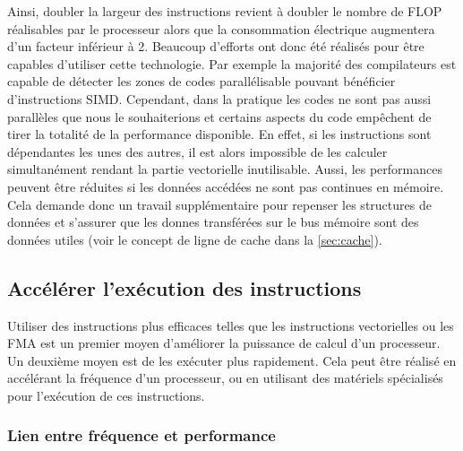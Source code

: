         
        Ainsi, doubler la largeur des instructions revient à doubler le nombre de \gls{FLOP} réalisables par le processeur alors que la consommation électrique augmentera d'un facteur inférieur à 2. Beaucoup d'efforts ont donc été réalisés pour être capables d'utiliser cette technologie. Par exemple la majorité des compilateurs est capable de détecter les zones de codes parallélisable pouvant bénéficier d'instructions SIMD.
        Cependant, dans la pratique les codes ne sont pas aussi parallèles que nous le souhaiterions et certains aspects du code empêchent de tirer la totalité de la performance disponible. En effet, si les instructions sont dépendantes les unes des autres, il est alors impossible de les calculer simultanément rendant la partie vectorielle inutilisable. Aussi, les performances peuvent être réduites si les données accédées ne sont pas continues en mémoire. Cela demande donc un travail supplémentaire pour repenser les structures de données et s'assurer que les donnes transférées sur le bus mémoire sont des données utiles (voir le concept de ligne de cache dans la \autoref{sec:cache}).



\subsection{Accélérer l'exécution des instructions} \label{sec:accelerer}

    Utiliser des instructions plus efficaces telles que les instructions vectorielles ou les FMA est un premier moyen d'améliorer la puissance de calcul d'un processeur. Un deuxième moyen est de les exécuter plus rapidement. Cela peut être réalisé en accélérant la fréquence d'un processeur, ou en utilisant des matériels spécialisés pour l'exécution de ces instructions.

    \subsubsection{Lien entre fréquence et performance} \label{sec:frequency}

